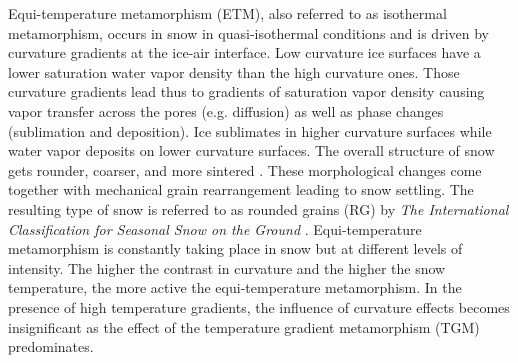 \documentclass[draft,ms]{agujournal2019}
\begin{document}
Equi-temperature metamorphism (ETM), also referred to as isothermal metamorphism, occurs in snow in quasi-isothermal conditions and is driven by curvature gradients at the ice-air interface. Low curvature ice surfaces have a lower saturation water vapor density than the high curvature ones. Those curvature gradients lead thus to gradients of saturation vapor density causing vapor transfer across the pores (e.g. diffusion) as well as phase changes (sublimation and deposition). Ice sublimates in higher curvature surfaces while  water vapor deposits on lower curvature surfaces. 
The overall structure of snow gets rounder, coarser, and more sintered \cite{colbeck_thermodynamics_1980}. These morphological changes come together with mechanical grain rearrangement leading to snow settling. The resulting type of snow is referred to as rounded grains (RG) by \textit{The International Classification for Seasonal Snow on the Ground} \cite{fierz2009international}. Equi-temperature metamorphism is constantly taking place in snow but at different levels of intensity. The higher the contrast in curvature and the higher the snow temperature, the more active the equi-temperature metamorphism. In the presence of high temperature gradients, the influence of curvature effects becomes insignificant as the effect of the temperature gradient metamorphism (TGM) predominates.\\
\end{document}
